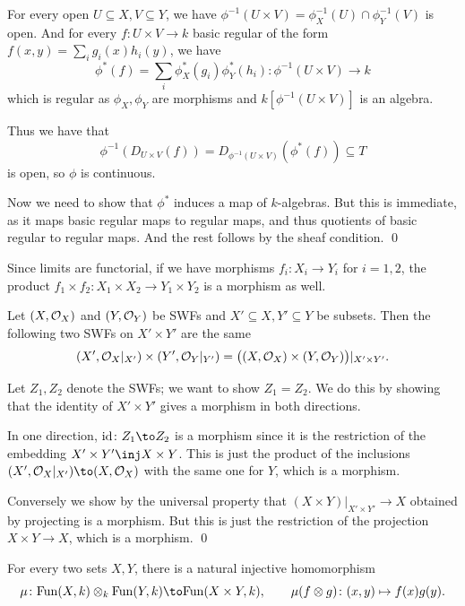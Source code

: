     For every open $U\subseteq X,V\subseteq Y$, we have $\phi^{-1}(U\times V)=\phi_X^{-1}(U)\cap\phi^{-1}_Y(V)$ is open.
    And for every $f\colon U\times V\to k$ basic regular of the form $f(x,y)=\sum_ig_i(x)h_i(y)$, we have
    $$ \phi^*(f) = \sum_i\phi^*_X(g_i)\phi^*_Y(h_i) \colon \phi^{-1}(U\times V) \to k $$
    which is regular as $\phi_X,\phi_Y$ are morphisms and $k[\phi^{-1}(U\times V)]$ is an algebra.

    Thus we have that
    $$ \phi^{-1}(D_{U\times V}(f)) = D_{\phi^{-1}(U\times V)}(\phi^*(f)) \subseteq T $$
    is open, so $\phi$ is continuous.

    Now we need to show that $\phi^*$ induces a map of $k$-algebras.
    But this is immediate, as it maps basic regular maps to regular maps, and thus quotients of basic regular to regular maps.
    And the rest follows by the sheaf condition.
    \qed

\eproof

Since limits are functorial, if we have morphisms $f_i\colon X_i\to Y_i$ for $i=1,2$, the product $f_1\times f_2\colon X_1\times X_2\to Y_1\times Y_2$
is a morphism as well.

\blemm

    Let $(X,{{\cal O}}_X)$ and $(Y,{{\cal O}}_Y)$ be SWFs and $X'\subseteq X,Y'\subseteq Y$ be subsets.
    Then the following two SWFs on $X'\times Y'$ are the same
    $$ (X',{{\cal O}}_X|_{X'}) \times (Y',{{\cal O}}_Y|_{Y'}) = \bigl((X,{{\cal O}}_X)\times(Y,{{\cal O}}_Y)\bigr)|_{X'\times Y'} . $$

\elemm

\bproof

    Let $Z_1,Z_2$ denote the SWFs; we want to show $Z_1=Z_2$.
    We do this by showing that the identity of $X'\times Y'$ gives a morphism in both directions.

    In one direction, $\id\colon Z_1\to Z_2$ is a morphism since it is the restriction of the embedding $X'\times Y'\inj X\times Y$.
    This is just the product of the inclusions $(X',\O_X|_{X'})\to(X,\O_X)$ with the same one for $Y$, which is a morphism.

    Conversely we show by the universal property that $(X\times Y)|_{X'\times Y'}\to X$ obtained by projecting is a morphism.
    But this is just the restriction of the projection $X\times Y\to X$, which is a morphism.
    \qed

\eproof

\blemm

    For every two sets $X,Y$, there is a natural injective homomorphism
    $$ \mu\colon \fun(X,k) \otimes_k \fun(Y,k) \to \fun(X\times Y,k),\qquad \mu(f\otimes g)\colon(x,y)\mapsto f(x)g(y) . $$

